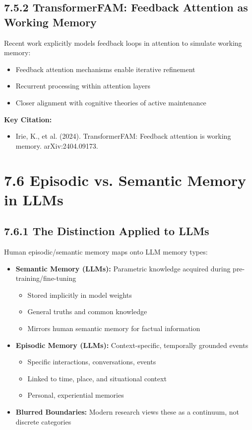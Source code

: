 \documentclass[11pt,letterpaper]{article}
\begin{document}
\subsection{7.5.2 TransformerFAM: Feedback Attention as Working Memory}

Recent work explicitly models feedback loops in attention to simulate working memory:

\begin{itemize}[leftmargin=*]
    \item Feedback attention mechanisms enable iterative refinement
    \item Recurrent processing within attention layers
    \item Closer alignment with cognitive theories of active maintenance
\end{itemize}

\textbf{Key Citation:}
\begin{itemize}[leftmargin=*]
    \item Irie, K., et al. (2024). TransformerFAM: Feedback attention is working memory. arXiv:2404.09173.
\end{itemize}

\section{\color{garnet}7.6 Episodic vs. Semantic Memory in LLMs}

\subsection{7.6.1 The Distinction Applied to LLMs}

Human episodic/semantic memory maps onto LLM memory types:

\begin{itemize}[leftmargin=*]
    \item \textbf{Semantic Memory (LLMs):} Parametric knowledge acquired during pre-training/fine-tuning
    \begin{itemize}
        \item Stored implicitly in model weights
        \item General truths and common knowledge
        \item Mirrors human semantic memory for factual information
    \end{itemize}
    \item \textbf{Episodic Memory (LLMs):} Context-specific, temporally grounded events
    \begin{itemize}
        \item Specific interactions, conversations, events
        \item Linked to time, place, and situational context
        \item Personal, experiential memories
    \end{itemize}
    \item \textbf{Blurred Boundaries:} Modern research views these as a continuum, not discrete categories
\end{itemize}
\end{document}
